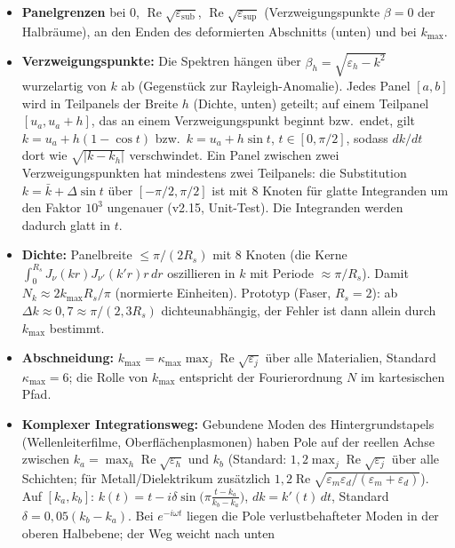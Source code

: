 \begin{itemize}[nosep]
  \item \textbf{Panelgrenzen} bei $0$, $\operatorname{Re}\sqrt{\varepsilon_{\text{sub}}}$, $\operatorname{Re}\sqrt{\varepsilon_{\text{sup}}}$
        (Verzweigungspunkte $\beta=0$ der Halbräume), an den Enden des deformierten Abschnitts (unten) und bei $k_{\max}$.
  \item \textbf{Verzweigungspunkte:} Die Spektren hängen über $\beta_h=\sqrt{\varepsilon_h-k^2}$ wurzelartig von $k$ ab
        (Gegenstück zur Rayleigh-Anomalie). Jedes Panel $[a,b]$ wird in Teilpanels der Breite $h$ (Dichte, unten)
        geteilt; auf einem Teilpanel $[u_a,u_a+h]$, das an einem Verzweigungspunkt beginnt bzw.\ endet, gilt
        $k=u_a+h(1-\cos t)$ bzw.\ $k=u_a+h\sin t$, $t\in[0,\pi/2]$, sodass $dk/dt$ dort wie $\sqrt{|k-k_h|}$ verschwindet.
        Ein Panel zwischen zwei Verzweigungspunkten hat mindestens zwei Teilpanels: die Substitution
        $k=\bar k+\Delta\sin t$ über $[-\pi/2,\pi/2]$ ist mit 8 Knoten für glatte Integranden um den Faktor $10^3$
        ungenauer (v2.15, Unit-Test). Die Integranden werden dadurch glatt in $t$.
  \item \textbf{Dichte:} Panelbreite $\le\pi/(2R_s)$ mit 8 Knoten (die Kerne $\int_0^{R_s}J_\nu(kr)J_{\nu'}(k'r)r\,dr$
        oszillieren in $k$ mit Periode $\approx\pi/R_s$). Damit $N_k\approx2k_{\max}R_s/\pi$ (normierte Einheiten).
        Prototyp (Faser, $R_s=2$): ab $\Delta k\approx0{,}7\approx\pi/(2{,}3R_s)$ dichteunabhängig, der Fehler ist dann
        allein durch $k_{\max}$ bestimmt.
  \item \textbf{Abschneidung:} $k_{\max}=\kappa_{\max}\max_j\operatorname{Re}\sqrt{\varepsilon_j}$ über alle Materialien,
        Standard $\kappa_{\max}=6$; die Rolle von $k_{\max}$ entspricht der Fourierordnung $N$ im kartesischen Pfad.
  \item \textbf{Komplexer Integrationsweg:} Gebundene Moden des Hintergrundstapels (Wellenleiterfilme,
        Oberflächenplasmonen) haben Pole auf der reellen Achse zwischen $k_a=\max_h\operatorname{Re}\sqrt{\varepsilon_h}$ und
        $k_b$ (Standard: $1{,}2\max_j\operatorname{Re}\sqrt{\varepsilon_j}$ über alle Schichten; für Metall/Dielektrikum
        zusätzlich $1{,}2\operatorname{Re}\sqrt{\varepsilon_m\varepsilon_d/(\varepsilon_m+\varepsilon_d)}$). Auf $[k_a,k_b]$:
        $k(t)=t-i\delta\sin\big(\pi\tfrac{t-k_a}{k_b-k_a}\big)$, $dk=k'(t)\,dt$, Standard $\delta=0{,}05(k_b-k_a)$.
        Bei $e^{-i\omega t}$ liegen die Pole verlustbehafteter Moden in der oberen Halbebene; der Weg weicht nach unten

\end{itemize}
